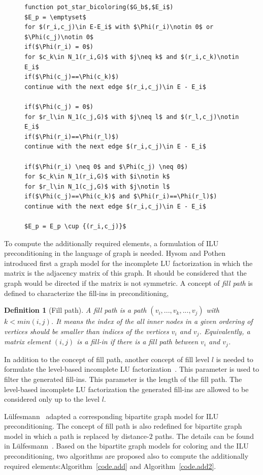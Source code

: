 \documentclass[11pt, twoside,a4paper]{book}
\newtheorem{definition}{Definition}
\newcommand{\coderef}[1]{Algorithm~\protect\ref{#1}}
\begin{document}
\begin{figure}
\begin{lstlisting}[caption=Find potentially required elements for star bicoloring,label=code.pot.sb,mathescape]
function pot_star_bicoloring($G_b$,$E_i$)
$E_p = \emptyset$
for $(r_i,c_j)\in E-E_i$ with $\Phi(r_i)\notin 0$ or $\Phi(c_j)\notin 0$
if($\Phi(r_i) = 0$)
for $c_k\in N_1(r_i,G)$ with $j\neq k$ and $(r_i,c_k)\notin E_i$
if($\Phi(c_j)==\Phi(c_k)$)
continue with the next edge $(r_i,c_j)\in E - E_i$

if($\Phi(c_j) = 0$)
for $r_l\in N_1(c_j,G)$ with $j\neq l$ and $(r_l,c_j)\notin E_i$
if($\Phi(r_i)==\Phi(r_l)$)
continue with the next edge $(r_i,c_j)\in E - E_i$

if($\Phi(r_i) \neq 0$ and $\Phi(c_j) \neq 0$)
for $c_k\in N_1(r_i,G)$ with $i\notin k$
for $r_l\in N_1(c_j,G)$ with $j\notin l$
if($\Phi(c_j)==\Phi(c_k)$ and $\Phi(r_i)==\Phi(r_l)$)
continue with the next edge $(r_i,c_j)\in E - E_i$

$E_p = E_p \cup {(r_i,c_j)}$
\end{lstlisting}
\end{figure}

To compute the additionally required elements, a formulation of ILU preconditioning
in the language of graph is needed.
Hysom and Pothen~\cite{precond-pothen} introduced first a graph model for the incomplete
LU factorization in which the matrix is the adjacency matrix of this graph.
It should be considered that the graph would be directed if the matrix is not symmetric.
A concept of \textit{fill path} is defined to characterize the fill-ins in preconditioning,
\begin{definition}[Fill path]\label{d.fill.path}
A fill path is a path $(v_i,...,v_k,...,v_j)$ with
$k<min(i,j)$. It means the index of the all inner nodes in a given ordering of vertices
should be smaller than indices of the vertices $v_i$ and $v_j$.
Equivalently, a matrix element $(i,j)$ is a fill-in if there is a fill path between
$v_i$ and $v_j$.
\end{definition}
In addition to the concept of fill path, another concept of fill level $l$ is needed to
formulate the level-based incomplete LU factorization~\cite{precond-pothen}.
This parameter is used to filter the generated fill-ins.
This parameter is the length of the fill path.
The level-based incomplete LU factorization the generated fill-ins are allowed
to be considered only up to the level $l$.

Lülfesmann~\cite{Lulfesmann2012Fap} adapted a
corresponding bipartite graph model for ILU preconditioning.
The concept of fill path is also redefined for bipartite graph model
in which a path is replaced by distance-$2$ paths.
The details can be found in Lülfesmann~\cite{Lulfesmann2012Fap}.
Based on the bipartite graph models for coloring and the ILU preconditioning,
two algorithms are proposed also to compute the additionally required
elements:\coderef{code.add} and \coderef{code.add2}.
\end{document}

